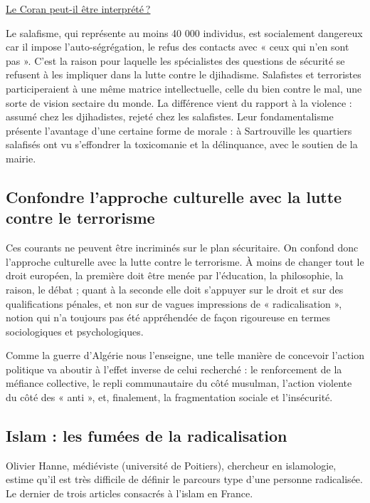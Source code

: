 \href{https://www.la-croix.com/Religion/Le-Coran-peut-etre-interprete-2021-01-25-1201136852}{Le
Coran peut-il être interprété ?}

Le salafisme, qui représente au moins 40 000 individus, est socialement
dangereux car il impose l'auto-ségrégation, le refus des contacts avec «
ceux qui n'en sont pas ». C'est la raison pour laquelle les spécialistes
des questions de sécurité se refusent à les impliquer dans la lutte
contre le djihadisme. Salafistes et terroristes participeraient à une
même matrice intellectuelle, celle du bien contre le mal, une sorte de
vision sectaire du monde. La différence vient du rapport à la violence :
assumé chez les djihadistes, rejeté chez les salafistes. Leur
fondamentalisme présente l'avantage d'une certaine forme de morale : à
Sartrouville les quartiers salafisés ont vu s'effondrer la toxicomanie
et la délinquance, avec le soutien de la mairie.

\subsection{Confondre l'approche culturelle avec la lutte contre le
terrorisme}

Ces courants ne peuvent être incriminés sur le plan sécuritaire. On
confond donc l'approche culturelle avec la lutte contre le terrorisme. À
moins de changer tout le droit européen, la première doit être menée par
l'éducation, la philosophie, la raison, le débat ; quant à la seconde
elle doit s'appuyer sur le droit et sur des qualifications pénales, et
non sur de vagues impressions de « radicalisation », notion qui n'a
toujours pas été appréhendée de façon rigoureuse en termes sociologiques
et psychologiques.

Comme la guerre d'Algérie nous l'enseigne, une telle manière de
concevoir l'action politique va aboutir à l'effet inverse de celui
recherché : le renforcement de la méfiance collective, le repli
communautaire du côté musulman, l'action violente du côté des « anti »,
et, finalement, la fragmentation sociale et l'insécurité.

\subsection{Islam : les fumées de la radicalisation}

Olivier Hanne, médiéviste (université de Poitiers), chercheur en
islamologie, estime qu'il est très difficile de définir le parcours type
d'une personne radicalisée. Le dernier de trois articles consacrés à
l'islam en France. 
 

